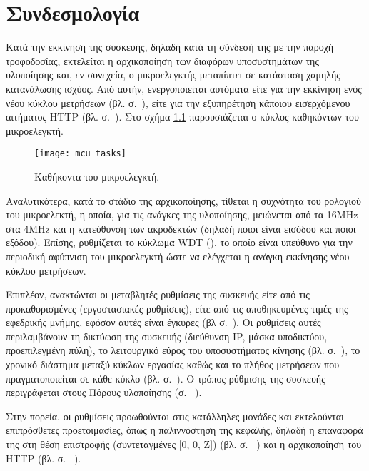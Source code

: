 \chapter{Συνδεσμολογία}

Κατά την εκκίνηση της συσκευής, δηλαδή κατά τη σύνδεσή της με την παροχή
τροφοδοσίας, εκτελείται η αρχικοποίηση των διαφόρων υποσυστημάτων της υλοποίησης
και, εν συνεχεία, ο μικροελεγκτής μεταπίπτει σε κατάσταση χαμηλής κατανάλωσης
ισχύος. Από αυτήν, ενεργοποιείται αυτόματα είτε για την εκκίνηση ενός νέου
κύκλου μετρήσεων (βλ.  σ.~\pageref{sec:task}), είτε για την
εξυπηρέτηση κάποιου εισερχόμενου αιτήματος HTTP (βλ.  σ.~\pageref{sec:network:impl-resources}). Στο σχήμα
\ref{fig:mcu:tasks} παρουσιάζεται ο κύκλος καθηκόντων του μικροελεγκτή.

\begin{figure}
    \caption{Καθήκοντα του μικροελεγκτή.\label{fig:mcu:tasks}}
    \begin{center}
    \texttt{[image: mcu\_tasks]}
    \end{center}
\end{figure}

Αναλυτικότερα, κατά το στάδιο της αρχικοποίησης, τίθεται η συχνότητα του
ρολογιού του μικροελεκτή, η οποία, για τις ανάγκες της υλοποίησης, μειώνεται από
τα 16MHz στα 4MHz και η κατεύθυνση των ακροδεκτών (δηλαδή ποιοι είναι εισόδου
και ποιοι εξόδου). Επίσης, ρυθμίζεται το κύκλωμα WDT (), το
οποίο είναι υπεύθυνο για την περιοδική αφύπνιση του μικροελεγκτή ώστε να
ελέγχεται η ανάγκη εκκίνησης νέου κύκλου μετρήσεων.

Επιπλέον, ανακτώνται οι μεταβλητές ρυθμίσεις της συσκευής είτε από τις
προκαθορισμένες (εργοστασιακές ρυθμίσεις), είτε από τις αποθηκευμένες τιμές της
εφεδρικής μνήμης, εφόσον αυτές είναι έγκυρες (βλ 
σ.~\pageref{subsec:backup-memory}).
Οι ρυθμίσεις αυτές περιλαμβάνουν τη δικτύωση της συσκευής (διεύθυνση IP, μάσκα
υποδικτύου, προεπιλεγμένη πύλη), το λειτουργικό εύρος του υποσυστήματος κίνησης
(βλ.  σ.~\pageref{sec:motor:coordinates}), το
χρονικό διάστημα μεταξύ κύκλων εργασίας καθώς και το πλήθος μετρήσεων που
πραγματοποιείται σε κάθε κύκλο (βλ.  σ.~\pageref{sec:task}).
Ο τρόπος ρύθμισης της συσκευής περιγράφεται στους Πόρους υλοποίησης (σ.~%
\pageref{sec:network:impl-resources}).

Στην πορεία, οι ρυθμίσεις προωθούνται στις κατάλληλες μονάδες και εκτελούνται
επιπρόσθετες προετοιμασίες, όπως η παλιννόστηση της κεφαλής, δηλαδή η επαναφορά
της στη θέση επιστροφής (συντεταγμένες [0, 0, Z]) (βλ. σ.~%
\pageref{sec:motor:homing}) και η αρχικοποίηση του HTTP  (βλ. σ.~%
\pageref{ssubsec:network:port_mr}).










